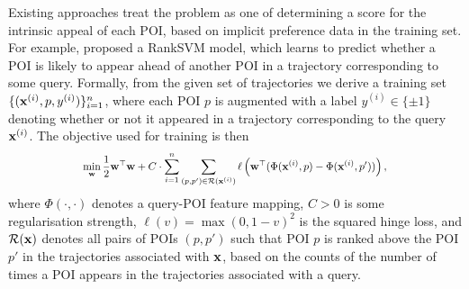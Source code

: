 Existing approaches treat the problem as one of determining a score for the intrinsic appeal of each POI,
based on implicit preference data in the training set.
For example, \citep{cikm16paper} proposed a RankSVM model,
which %
learns to predict whether a POI is likely to appear ahead of another POI in a trajectory corresponding to some query.
Formally,
from the given set of trajectories
we derive a training set $\{ ( \mathbf{x}^{(i)}, p, y^{(i)} ) \}_{i = 1}^n$,
where each POI $p$ is augmented with a label $y^{(i)} \in \{ \pm 1 \}$ denoting whether or not it appeared in a trajectory corresponding to the query $\mathbf{x}^{(i)}$. 
The objective used for training is then
\begin{equation*}
\resizebox{0.7\linewidth}{!}{$\displaystyle
\displaystyle \min_{\w} \frac{1}{2} \w^\top \w + C \cdot \sum_{i = 1}^n \sum_{(p, p') \in \mathcal{R}( \x^{(i)} )} 
\ell\left( \w^\top ( \Phi( \x^{(i)}, p ) - \Phi( \x^{(i)}, p' ) ) \right),
$}
\end{equation*}
where
$\Phi( \cdot, \cdot )$ denotes a query-POI feature mapping,
$C > 0$ is some regularisation strength,
$\ell( v ) = \max( 0, 1 - v )^2$ is the squared hinge loss,
and
$\mathcal{R}( \mathbf{x} )$
denotes all pairs of POIs $(p, p')$ such that
POI $p$ is ranked above the POI $p'$ in the trajectories associated with $\mathbf{x}$, %
\eg based on the counts of the number of times a POI appears in the trajectories associated with a query.

